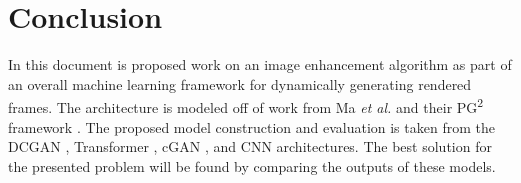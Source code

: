 \documentclass[letterpaper]{article} %
\begin{document}
\section{Conclusion}
\label{sec:conclusion}
In this document is proposed work on an image enhancement algorithm as
part of an overall machine learning framework for dynamically
generating rendered frames. The architecture is modeled off of work from
Ma \textit{et al.} and their PG\textsuperscript{2} framework
\cite{pose_guided_image_generation}.
The proposed model construction and evaluation is taken from
the DCGAN \cite{unsupervised_learning},
Transformer \cite{generative_transformers},
cGAN \cite{image_to_image},
and
CNN \cite{pixelcnn++}
architectures.
The best solution for the presented problem will be found
by comparing the outputs of these models.

\nocite{pixel_recurrent}
\nocite{parallel_density}



\end{document}
